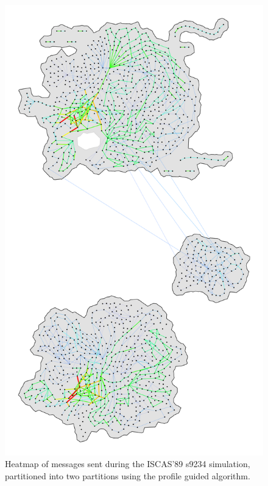 \documentclass[11pt]{book}
\begin{document}
\begin{figure}
\centering
\includegraphics[width=\textwidth,height=0.9\textheight,keepaspectratio]{figs/s9234_2part}
\caption{Heatmap of messages sent during the ISCAS'89 s9234 simulation, partitioned into two partitions using the profile guided algorithm.}
\end{figure}
\end{document}
